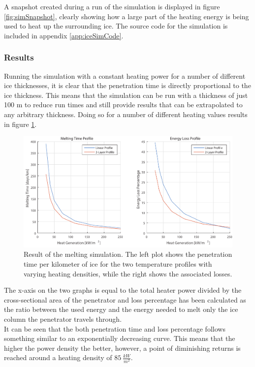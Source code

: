 \noindent 
A snapshot created during a run of the simulation is displayed in figure \ref{fig:simSnapshot}, clearly showing how a large part of the heating energy is being used to heat up the surrounding ice. The source code for the simulation is included in appendix \ref{app:iceSimCode}.


\subsubsection{Results}
Running the simulation with a constant heating power for a number of different ice thicknesses, it is clear that the penetration time is directly proportional to the ice thickness. This means that the simulation can be run with a thickness of just 100 m to reduce run times and still provide results that can be extrapolated to any arbitrary thickness. Doing so for a number of different heating values results in figure \ref{fig:simResults}.

\begin{figure}[ht]
	\centering
	\includegraphics[width=.9\textwidth]{figures/LAMC/simResult.pdf}
	\caption{Result of the melting simulation. The left plot shows the penetration time per kilometer of ice for the two temperature profiles with varying heating densities, while the right shows the associated losses.}
	\label{fig:simResults}
\end{figure}

\noindent
The x-axis on the two graphs is equal to the total heater power divided by the cross-sectional area of the penetrator and loss percentage has been calculated as the ratio between the used energy and the energy needed to melt only the ice column the penetrator travels through. \\

\noindent
It can be seen that the both penetration time and loss percentage follows something similar to an exponentially decreasing curve. This means that the higher the power density the better, however, a point of diminishing returns is reached around a heating density of $\SI{85}{\frac{kW}{m^2}}$. \\

